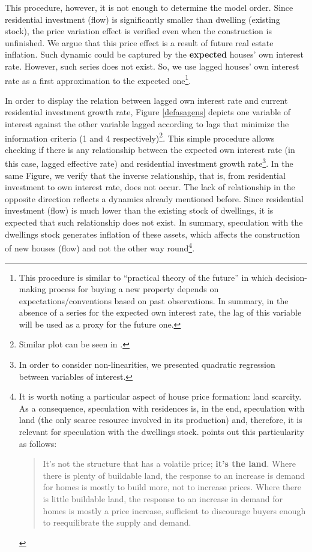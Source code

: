 This procedure, however, it is not enough to determine the model order. 
Since residential investment (flow) is significantly smaller than dwelling (existing stock), the price variation effect  is verified even when the construction is unfinished. 
We argue that this price effect is a result of future real estate inflation.
Such dynamic could be captured by the \textbf{expected} houses' own interest rate.
However, such series does not exist. So, we use lagged houses' own interest rate as a first approximation to the expected one\footnote{
	This procedure is similar to \textcite{keynes_general_1937} ``practical theory of the future'' in which decision-making process for buying a new property depends on expectations/conventions based on past observations. 
	In summary, in the absence of a series for the expected own interest rate, the lag of this variable will be used as a proxy for the future one.
}.

In order to display the relation between lagged own interest rate and current residential investment growth rate, Figure \ref{defasagens} depicts one variable of interest against the other variable lagged according to lags that minimize the information criteria (1 and 4 respectively)\footnote{
	Similar plot can be seen in \textcite[p.~16]{girardi_autonomous_2015}.
}.
This simple procedure allows checking if there is any relationship between the expected own interest rate (in this case, lagged effective rate) and residential investment growth rate\footnote{
	In order to consider non-linearities, we presented quadratic regression between variables of interest.
}.
In the same Figure, we verify that the inverse relationship, that is, from residential investment to own interest rate, does not occur. 
The lack of relationship in the opposite direction reflects a dynamics already mentioned before.
Since residential investment (flow) is much lower than the existing stock of dwellings, it is expected that such relationship does not exist.
In summary, speculation with the dwellings stock generates inflation of these assets, which affects the construction of new houses (flow) and not the other way round\footnote{
	It is worth noting a particular aspect of house price formation: land scarcity. As a consequence, speculation with residences is, in the end, speculation with land (the only scarce resource involved in its production) and, therefore, it is relevant for speculation with the dwellings stock. 
	\textcite[p.~349, emphasis added]{leamer_housing_2007} points out this particularity as follows:
	\begin{quotation}
		It’s not the structure that has a volatile price; \textbf{it's the land}. Where there is plenty of buildable land, the response to an increase is demand for homes is mostly to build more, not to increase prices. Where there is little buildable land, the response to an increase in demand for homes is mostly a price increase, sufficient to discourage buyers enough to reequilibrate the supply and demand.
	\end{quotation}
}.


